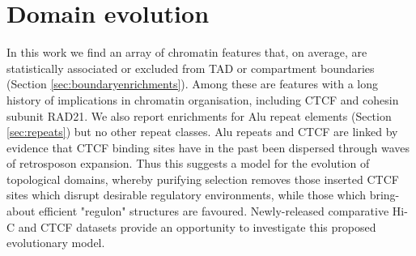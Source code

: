 \documentclass[a4paper,11pt,oneside]{book}
\begin{document}
\section{Domain evolution}

In this work we find an array of chromatin features that, on average, are statistically associated or excluded from TAD or compartment boundaries (Section \ref{sec:boundaryenrichments}). Among these are features with a long history of implications in chromatin organisation, including CTCF and cohesin subunit RAD21. We also report enrichments for Alu repeat elements (Section \ref{sec:repeats}) but no other repeat classes. Alu repeats and CTCF are linked by evidence that CTCF binding sites have in the past been dispersed through waves of retrosposon expansion.\cite{Schmidt2012, Nikolaev2009} Thus this suggests a model for the evolution of topological domains, whereby purifying selection removes those inserted CTCF sites which disrupt desirable regulatory environments, while those which bring-about efficient "regulon" structures are favoured. Newly-released comparative Hi-C and CTCF datasets\cite{VietriRudan2015} provide an opportunity to investigate this proposed evolutionary model. 


\end{document}
